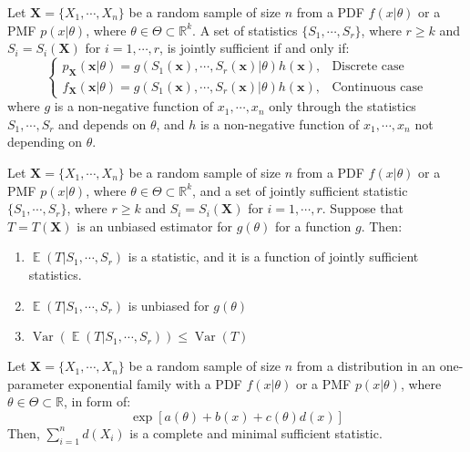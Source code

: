 \documentclass{huhtakm-template-book-v2}
\DeclareMathOperator{\E}{\mathbb{E}}
\DeclareMathOperator{\Var}{Var}
\begin{document}
\begin{thm}
	Let $\mathbf{X}=\{X_{1},\cdots,X_{n}\}$ be a random sample of size $n$ from a PDF $f(x|\theta)$ or a PMF $p(x|\theta)$, where $\theta\in\Theta\subset\mathbb{R}^{k}$. A set of statistics $\{S_{1},\cdots,S_{r}\}$, where $r\geq k$ and $S_{i}=S_{i}(\mathbf{X})$ for $i=1,\cdots,r$, is jointly sufficient if and only if:
	\begin{equation*}
		\begin{cases}
			p_{\mathbf{X}}(\mathbf{x}|\theta)=g(S_{1}(\mathbf{x}),\cdots,S_{r}(\mathbf{x})|\theta)h(\mathbf{x}), &\text{Discrete case}\\
			f_{\mathbf{X}}(\mathbf{x}|\theta)=g(S_{1}(\mathbf{x}),\cdots,S_{r}(\mathbf{x})|\theta)h(\mathbf{x}), &\text{Continuous case}
		\end{cases}
	\end{equation*}
	where $g$ is a non-negative function of $x_{1},\cdots,x_{n}$ only through the statistics $S_{1},\cdots,S_{r}$ and depends on $\theta$, and $h$ is a non-negative function of $x_{1},\cdots,x_{n}$ not depending on $\theta$.
\end{thm}
\begin{thm}
	Let $\mathbf{X}=\{X_{1},\cdots,X_{n}\}$ be a random sample of size $n$ from a PDF $f(x|\theta)$ or a PMF $p(x|\theta)$, where $\theta\in\Theta\subset\mathbb{R}^{k}$, and a set of jointly sufficient statistic $\{S_{1},\cdots,S_{r}\}$, where $r\geq k$ and $S_{i}=S_{i}(\mathbf{X})$ for $i=1,\cdots,r$. Suppose that $T=T(\mathbf{X})$ is an unbiased estimator for $g(\theta)$ for a function $g$. Then:
	\begin{enumerate}
		\item $\E(T|S_{1},\cdots,S_{r})$ is a statistic, and it is a function of jointly sufficient statistics.
		\item $\E(T|S_{1},\cdots,S_{r})$ is unbiased for $g(\theta)$
		\item $\Var(\E(T|S_{1},\cdots,S_{r}))\leq\Var(T)$
	\end{enumerate}
\end{thm}
\begin{thm}
	Let $\mathbf{X}=\{X_{1},\cdots,X_{n}\}$ be a random sample of size $n$ from a distribution in an one-parameter exponential family with a PDF $f(x|\theta)$ or a PMF $p(x|\theta)$, where $\theta\in\Theta\subset\mathbb{R}$, in form of:
	\begin{equation*}
		\exp[a(\theta)+b(x)+c(\theta)d(x)]
	\end{equation*}
	Then, $\sum_{i=1}^{n}d(X_{i})$ is a complete and minimal sufficient statistic.
\end{thm}
\end{document}

